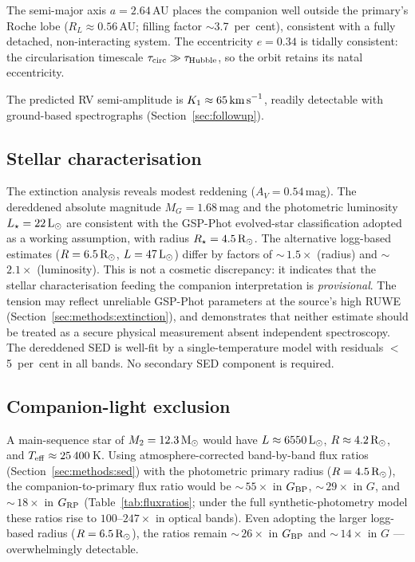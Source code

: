 \documentclass[usenatbib,fleqn]{mnras}
\newcommand{\Msun}{{\rm M}_\odot}
\newcommand{\Lsun}{{\rm L}_\odot}
\newcommand{\Rsun}{{\rm R}_\odot}
\newcommand{\kms}{{\rm km\,s}^{-1}}
\begin{document}
The semi-major axis $a = 2.64$\,AU places the companion well
outside the primary's Roche lobe ($R_L \approx 0.56$\,AU; filling
factor $\sim$3.7~per~cent), consistent with a fully detached,
non-interacting system.  The eccentricity $e = 0.34$ is
tidally consistent: the circularisation timescale
$\tau_{\rm circ} \gg \tau_{\rm Hubble}$, so the orbit retains its
natal eccentricity.

The predicted RV semi-amplitude is $K_1 \approx 65\,\kms$,
readily detectable with ground-based spectrographs
(Section~\ref{sec:followup}).

\subsection{Stellar characterisation}
\label{sec:results:stellar}

The extinction analysis reveals modest reddening
($A_V = 0.54$\,mag).  The dereddened absolute magnitude
$M_G = 1.68$\,mag and the photometric luminosity
$L_\star = 22\,\Lsun$ are consistent with the GSP-Phot
evolved-star classification adopted as a working assumption,
with radius $R_\star = 4.5\,\Rsun$.
The alternative logg-based estimates ($R = 6.5\,\Rsun$,
$L = 47\,\Lsun$) differ by factors of $\sim$\,$1.5\times$
(radius) and $\sim$\,$2.1\times$ (luminosity).  This is not
a cosmetic discrepancy: it indicates that the stellar
characterisation feeding the companion interpretation is
\emph{provisional}.  The tension may reflect unreliable
GSP-Phot parameters at the source's high RUWE
(Section~\ref{sec:methods:extinction}), and demonstrates that
neither estimate should be treated as a secure physical measurement
absent independent spectroscopy.  The dereddened
SED is well-fit by a single-temperature model with residuals
$<$\,5~per~cent in all bands.  No secondary SED component is
required.

\subsection{Companion-light exclusion}
\label{sec:results:companion}

A main-sequence star of $M_2 = 12.3\,\Msun$ would have
$L \approx 6550\,\Lsun$, $R \approx 4.2\,\Rsun$, and
$T_{\rm eff} \approx 25\,400$\,K.  Using atmosphere-corrected
band-by-band flux ratios (Section~\ref{sec:methods:sed}) with the
photometric primary radius ($R = 4.5\,\Rsun$), the
companion-to-primary flux ratio would be $\sim$\,$55\times$ in
$G_{\rm BP}$, $\sim$\,$29\times$ in $G$, and
$\sim$\,$18\times$ in $G_{\rm RP}$
(Table~\ref{tab:fluxratios}; under the full synthetic-photometry
model these ratios rise to $100$--$247\times$ in optical bands).
Even adopting the larger
logg-based radius ($R = 6.5\,\Rsun$), the ratios remain
$\sim$\,$26\times$ in $G_{\rm BP}$ and $\sim$\,$14\times$ in $G$
--- overwhelmingly detectable.
\end{document}
